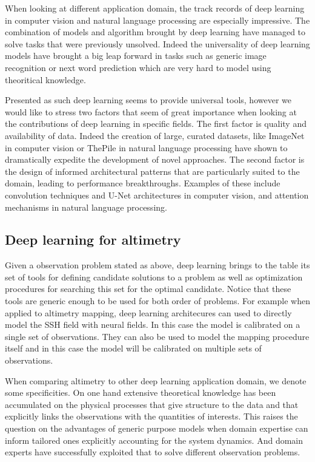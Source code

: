 \begin{bibunit}
When looking at different application domain, the track records of deep learning in computer vision\cite{} and natural language processing\cite{} are especially impressive. 
The combination of models and algorithm brought by deep learning have managed to solve tasks that were previously unsolved.
Indeed the universality of deep learning models have brought a big leap forward in tasks such as generic image recognition or next word prediction which are very hard to model using theoritical knowledge.

Presented as such deep learning seems to provide universal tools,  
however we would like to stress two factors that seem of great importance when looking at the contributions of deep learning in specific fields.
The first factor is quality and availability of data.
Indeed the creation of large, curated datasets, like ImageNet\cite{} in computer vision or ThePile\cite{} in natural language processing have shown to dramatically expedite the development of novel approaches. 
The second factor is the design of informed architectural patterns that are particularly suited to the domain, leading to performance breakthroughs.
Examples of these include convolution techniques\cite{} and U-Net architectures\cite{} in computer vision, and attention mechanisms\cite{} in natural language processing.


\subsection{Deep learning for altimetry}
Given a observation problem stated as above, deep learning brings to the table its set of tools for defining candidate solutions to a problem as well as optimization procedures for searching this set for the optimal candidate.
Notice that these tools are generic enough to be used for both order of problems. For example when applied to altimetry mapping, deep learning architecures can used to directly model the SSH field with neural fields\cite{}. In this case the model is calibrated on a single set of observations.
They can also be used to model the mapping procedure itself\cite{} and in this case the model will be calibrated on multiple sets of observations.

When comparing altimetry to other deep learning application domain, we denote some specificities.
On one hand extensive theoretical knowledge has been accumulated on the physical processes that give structure to the data and that explicitly links the observations with the quantities of interests.
This raises the question on the advantages of generic purpose models when domain expertise can inform tailored ones explicitly accounting for the system dynamics.
And domain experts have successfully exploited that to solve different observation problems.


\end{bibunit}
